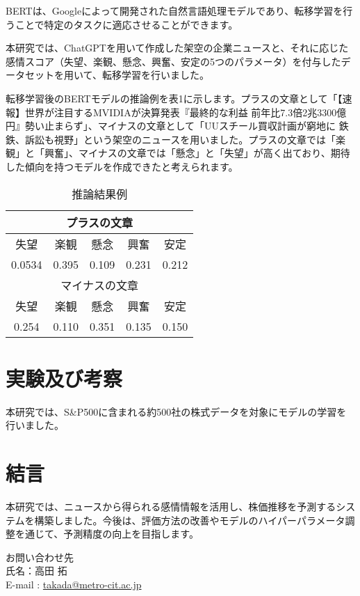 \documentclass[a4paper,11pt]{article}
\begin{document}
BERTは、Googleによって開発された自然言語処理モデルであり、転移学習を行うことで特定のタスクに適応させることができます。

本研究では、ChatGPTを用いて作成した架空の企業ニュースと、それに応じた感情スコア（失望、楽観、懸念、興奮、安定の5つのパラメータ）を付与したデータセットを用いて、転移学習を行いました。

転移学習後のBERTモデルの推論例を表1に示します。プラスの文章として「【速報】世界が注目するMVIDIAが決算発表『最終的な利益 前年比7.3倍2兆3300億円』勢い止まらず」、マイナスの文章として「UUスチール買収計画が窮地に 鉄鉄、訴訟も視野」という架空のニュースを用いました。プラスの文章では「楽観」と「興奮」、マイナスの文章では「懸念」と「失望」が高く出ており、期待した傾向を持つモデルを作成できたと考えられます。

\begin{table}[htbp]
    \centering
    \begin{tabular}{|c|c|c|c|c|}\hline
        \multicolumn{5}{|c|}{プラスの文章} \\ \hline
        失望 & 楽観 & 懸念 & 興奮 & 安定 \\ \hline
        0.0534 & 0.395 & 0.109 & 0.231 & 0.212 \\ \hline
        \multicolumn{5}{|c|}{マイナスの文章} \\ \hline
        失望 & 楽観 & 懸念 & 興奮 & 安定 \\ \hline
        0.254 & 0.110 & 0.351 & 0.135 & 0.150 \\ \hline
    \end{tabular}

    \caption{推論結果例}
\end{table}

\section{実験及び考察}

本研究では、S\&P500に含まれる約500社の株式データを対象にモデルの学習を行いました。

\section{結言}

本研究では、ニュースから得られる感情情報を活用し、株価推移を予測するシステムを構築しました。今後は、評価方法の改善やモデルのハイパーパラメータ調整を通じて、予測精度の向上を目指します。

\noindent
{}

お問い合わせ先\\
氏名：高田 拓 \\
E-mail : \href{mailto:takada@metro-cit.ac.jp}{takada@metro-cit.ac.jp}
\end{document}
